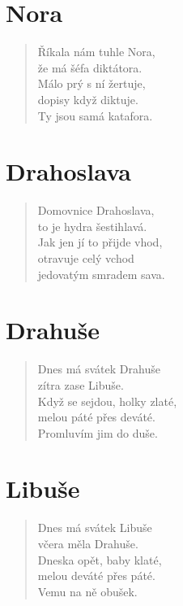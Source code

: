 \section*{Nora}
\begin{verse}
Říkala nám tuhle Nora,\\
že má šéfa diktátora.\\
Málo prý s ní žertuje,\\
dopisy když diktuje.\\
Ty jsou samá katafora.
\end{verse}    

\section*{Drahoslava}
\begin{verse}
Domovnice Drahoslava,\\
to je hydra šestihlavá.\\
Jak jen jí to přijde vhod,\\
otravuje celý vchod\\
jedovatým smradem sava.
\end{verse}

\section*{Drahuše}
\begin{verse}
Dnes má svátek Drahuše\\
zítra zase Libuše.\\
Když se sejdou, holky zlaté,\\
melou páté přes deváté.\\
Promluvím jim do duše.
\end{verse}    

\section*{Libuše}
\begin{verse}
Dnes má svátek Libuše\\
včera měla Drahuše.\\
Dneska opět, baby klaté,\\
melou deváté přes páté.\\
Vemu na ně obušek.
\end{verse}    

